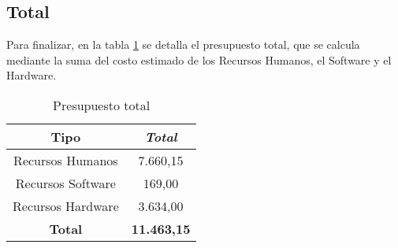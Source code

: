 \subsection{Total}

Para finalizar, en la tabla \ref{tab:total-budget} se detalla el presupuesto total, que se calcula mediante la suma del costo estimado de los Recursos Humanos, el Software y el Hardware.

\begin{table}[htp]
	\centering
	\caption{Presupuesto total}\label{tab:total-budget}
	\begin{tabular}{cc}
		\toprule
    	\textbf{Tipo} 		& 	\emph{Total}\\
    	\midrule
    	Recursos Humanos	& 			7.660,15\\
		Recursos Software	&			169,00\\
		Recursos Hardware	&			3.634,00\\
		\textbf{Total}		&	\textbf{11.463,15}\\
    	\bottomrule
    \end{tabular}
\end{table}